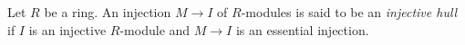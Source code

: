 \begin{definition}
\label{definition-injective-hull}
Let $R$ be a ring. An injection $M \to I$ of $R$-modules is said
to be an {\it injective hull} if $I$ is an injective $R$-module and
$M \to I$ is an essential injection.
\end{definition}